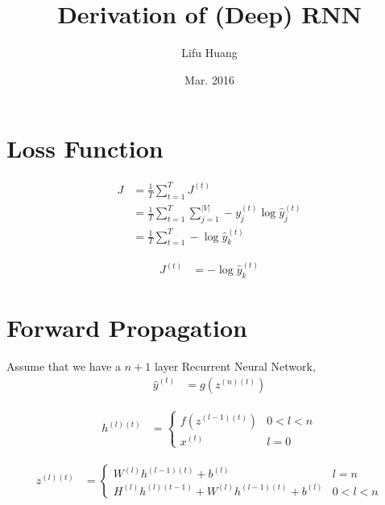 \documentclass{article}
\title{Derivation of (Deep) RNN}
\author{Lifu Huang}
\date{Mar. 2016}
\begin{document}
	\maketitle
	\section{Loss Function}
	\begin{equation}
	\begin{aligned}
		J &= \frac{1}{T}\sum_{t=1}^{T} J^{(t)} \\
		&= \frac{1}{T}\sum_{t=1}^{T} \sum_{j=1}^{|V|} -y^{(t)}_j \log \hat{y}^{(t)}_j \\
		&= \frac{1}{T} \sum_{t=1}^T -\log{\hat{y}_k^{(t)}}	
	\end{aligned}
	\end{equation}
	
	\begin{equation}
	\begin{aligned}	
		J^{(t)} &= -\log{\hat{y}^{(t)}_k}
	\end{aligned}
	\end{equation}
	
	\section{Forward Propagation}
	Assume that we have a $n+1$ layer Recurrent Neural Network,
	\begin{equation}
	\begin{aligned}
		\hat{y}^{(t)} &= g(z^{(n)(t)}) 
	\end{aligned}	
	\end{equation}
	
	\begin{equation}
	\begin{aligned}
		h^{(l)(t)} &= 
		\begin{cases}
			f(z^{(l-1)(t)}) &0 < l < n\\
			x^{(t)} &l = 0
		\end{cases}	
	\end{aligned}	
	\end{equation}
	
	\begin{equation}
	\begin{aligned}
		z^{(l)(t)} &= 
		\begin{cases}
			W^{(l)} h^{(l-1)(t)} + b^{(l)} &l = n\\
			H^{(l)} h^{(l)(t-1)} + W^{(l)} h^{(l-1)(t)} + b^{(l)} &0 < l < n
		\end{cases}
	\end{aligned}
	\end{equation}
	\newpage
\end{document}
